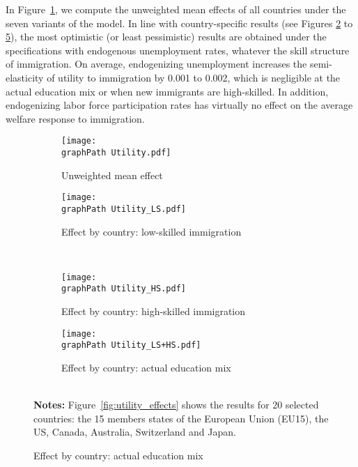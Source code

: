 \documentclass[a4paper,12pt]{article}
\def \graphPath {graphs/}
\begin{document}
In Figure~\ref{fig:utility_effects_a}, we compute the unweighted mean effects of all countries under the seven variants of the model. In line with country-specific results (see Figures \ref{fig:utility_effects_b} to \ref{fig:utility_effects_d}), the most optimistic (or least pessimistic) results are obtained under the specifications with endogenous unemployment rates, whatever the skill structure of immigration. On average, endogenizing unemployment increases the semi-elasticity of utility to immigration by 0.001 to 0.002, which is negligible at the actual education mix or when new immigrants are high-skilled. In addition, endogenizing labor force participation rates has virtually no effect on the average welfare response to immigration.

\begin{landscape}
\vspace*{\fill}
\begin{center}
\renewcommand{\arraystretch}{0.55}
\begin{figure}[htb!]
\caption{Average utility effect of immigration (1\% of the total labor
force) -- Sensitivity to labor market modeling}
\label{fig:utility_effects}
\centering
\begin{subfigure}{.45\linewidth}
\caption{Unweighted mean effect} \label{fig:utility_effects_a}
  \centering
  \texttt{[image: \\graphPath Utility.pdf]}
\end{subfigure}
\hfill
\begin{subfigure}{.45\linewidth}
  \centering
  \caption{Effect by country: low-skilled immigration} \label{fig:utility_effects_b}
  \texttt{[image: \\graphPath Utility\_LS.pdf]}
\end{subfigure}
\\[0.5cm]
\begin{subfigure}{.45\linewidth}
  \centering
  \caption{Effect by country: high-skilled immigration} \label{fig:utility_effects_c}
  \texttt{[image: \\graphPath Utility\_HS.pdf]}
\end{subfigure}%
\hfill
\begin{subfigure}{.45\linewidth}
  \centering
  \caption{Effect by country: actual education mix} \label{fig:utility_effects_d}
  \texttt{[image: \\graphPath Utility\_LS+HS.pdf]}
\end{subfigure}
\\[0.5cm]
{\footnotesize \textbf{Notes:} Figure~\ref{fig:utility_effects} shows the results for 20 selected countries: the 15 members states of the European Union (EU15), the US, Canada,
Australia, Switzerland and Japan.}
\end{figure}
\end{center}
\vspace*{\fill}
\end{landscape}
\restoregeometry
\end{document}
